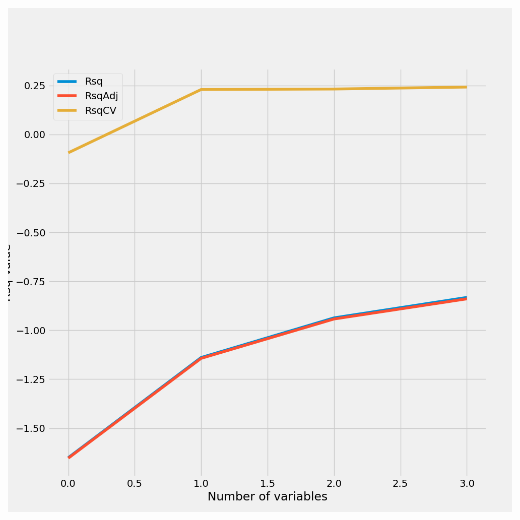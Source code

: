 \documentclass{article}
\begin{document}
	\includegraphics[scale = 0.2]{../plots/python/ConcreteStepwisePCP.png}
	
\end{document}
